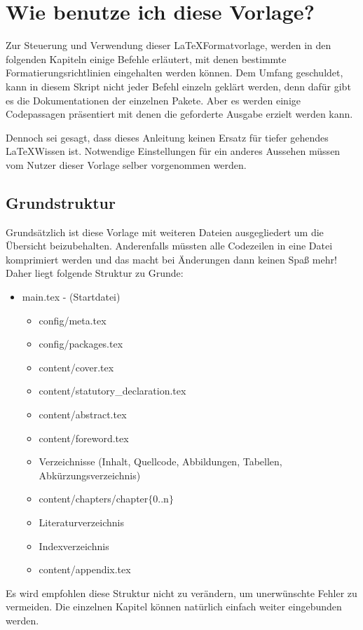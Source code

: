 \chapter{Wie benutze ich diese Vorlage?}
	\label{chap:wiebenutzeichdiesevorlage}
	
	
	Zur Steuerung und Verwendung dieser \LaTeX Formatvorlage, werden in den folgenden Kapiteln einige Befehle erläutert, mit denen bestimmte Formatierungsrichtlinien eingehalten
	werden können. Dem Umfang geschuldet, kann in diesem Skript nicht jeder Befehl einzeln geklärt werden, denn dafür gibt es die Dokumentationen der einzelnen 
	Pakete. Aber es werden einige Codepassagen präsentiert mit denen die geforderte Ausgabe erzielt werden kann.
	
	Dennoch sei gesagt, dass dieses Anleitung keinen Ersatz für tiefer gehendes \LaTeX Wissen ist. Notwendige Einstellungen für ein anderes Aussehen müssen vom Nutzer dieser Vorlage selber vorgenommen werden.
	
	\section{Grundstruktur}
		\label{sec:grundstruktur}
		Grundsätzlich ist diese Vorlage mit weiteren Dateien ausgegliedert um die Übersicht beizubehalten.  Anderenfalls müssten alle Codezeilen in eine Datei komprimiert werden und das macht bei Änderungen dann keinen Spaß mehr!
		Daher liegt folgende Struktur zu Grunde:
		\begin{itemize}[noitemsep]
			\item main.tex - (Startdatei)
			\begin{itemize}[noitemsep]
				\item config/meta.tex
				\item config/packages.tex
				\item content/cover.tex
				\item content/statutory\_declaration.tex
				\item content/abstract.tex
				\item content/foreword.tex
				\item Verzeichnisse (Inhalt, Quellcode, Abbildungen, Tabellen, Abkürzungsverzeichnis)
				\item content/chapters/chapter$\{$0..n$\}$
				\item Literaturverzeichnis
				\item Indexverzeichnis
				\item content/appendix.tex
			\end{itemize}
		\end{itemize}
		Es wird empfohlen diese Struktur nicht zu verändern, um unerwünschte Fehler zu vermeiden. Die einzelnen Kapitel können natürlich einfach weiter eingebunden werden.	
	
